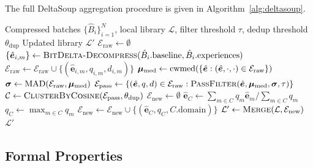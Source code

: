 The full DeltaSoup aggregation procedure is given in Algorithm~\ref{alg:deltasoup}.

\begin{algorithm}[H]
\caption{\textsc{DeltaSoup}}
\label{alg:deltasoup}
\begin{algorithmic}[1]
\Require Compressed batches $\{\hat{B}_i\}_{i=1}^N$, local library $\mathcal{L}$,
         filter threshold $\tau$, dedup threshold $\theta_{\text{dup}}$
\Ensure Updated library $\mathcal{L}'$
\State $\mathcal{E}_{\text{raw}} \gets \emptyset$
        \State $\{\hat{\bm{e}}_{i,m}\} \gets \textsc{BitDelta-Decompress}(\hat{B}_i.\text{baseline}, \hat{B}_i.\text{experiences})$
        \State $\mathcal{E}_{\text{raw}} \gets \mathcal{E}_{\text{raw}} \cup \{(\hat{\bm{e}}_{i,m}, q_{i,m}, d_{i,m})\}$
    \EndIf
\EndFor
\State $\bm{\mu}_{\operatorname{med}} \gets \text{cwmed}(\{\hat{\bm{e}} : (\hat{\bm{e}}, \cdot, \cdot) \in \mathcal{E}_{\text{raw}}\})$
\State $\bm{\sigma} \gets \text{MAD}(\mathcal{E}_{\text{raw}}, \bm{\mu}_{\operatorname{med}})$
\State $\mathcal{E}_{\text{pass}} \gets \{(\hat{\bm{e}}, q, d) \in \mathcal{E}_{\text{raw}} : \textsc{PassFilter}(\hat{\bm{e}}, \bm{\mu}_{\operatorname{med}}, \bm{\sigma}, \tau)\}$
\State $\mathcal{C} \gets \textsc{ClusterByCosine}(\mathcal{E}_{\text{pass}}, \theta_{\text{dup}})$
\State $\mathcal{E}_{\text{new}} \gets \emptyset$
    \State $\hat{\bm{e}}_C \gets \sum_{m \in C} q_m \hat{\bm{e}}_m / \sum_{m \in C} q_m$
    \State $q_C \gets \max_{m \in C} q_m$ 
    \State $\mathcal{E}_{\text{new}} \gets \mathcal{E}_{\text{new}} \cup \{(\hat{\bm{e}}_C, q_C, C.\text{domain})\}$
\EndFor
\State $\mathcal{L}' \gets \textsc{Merge}(\mathcal{L}, \mathcal{E}_{\text{new}})$
\State \Return $\mathcal{L}'$
\end{algorithmic}
\end{algorithm}

\subsection{Formal Properties}

